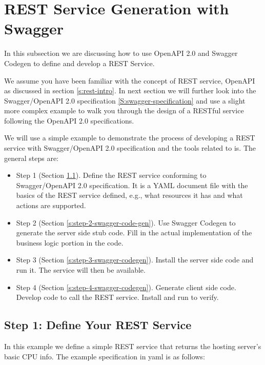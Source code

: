 
\section{REST Service Generation with Swagger}
\label{c:swagger-codegen}


In this subsection we are discussing how to use OpenAPI 2.0 and Swagger
Codegen to define and develop a REST Service.

We assume you have been familiar with the concept of REST service,
OpenAPI as discussed in section \ref{s:rest-intro}.
In next section we will further look into the
Swagger/OpenAPI 2.0 specification \ref{S:swagger-specification} and
use a slight more complex example to walk you through the design of
a RESTful service following the OpenAPI 2.0 specifications.

We will use a simple example to demonstrate the process of developing a
REST service with Swagger/OpenAPI 2.0 specification and the tools
related to is. The general steps are:

\begin{itemize}
\item Step 1 (Section \ref{s:step-1-define-your-rest-service}). Define
  the REST service conforming to Swagger/OpenAPI 2.0 specification. It
  is a YAML document file with the basics of the REST service defined,
  e.g., what resources it has and what actions are supported.
\item Step 2 (Section \ref{s:step-2-swagger-code-gen}). Use Swagger
  Codegen to generate the server side stub code.  Fill in the actual
  implementation of the business logic portion in the code.
\item Step 3 (Section \ref{s:step-3-swagger-codegen}). Install the
  server side code and run it. The service will then be available.
\item Step 4 (Section \ref{s:step-4-swagger-codegen}). Generate client
  side code. Develop code to call the REST service. Install and run to
  verify.
\end{itemize}

\subsection{Step 1: Define Your REST  Service}
\label{s:step-1-define-your-rest-service}

In this example we define a simple REST service that returns the hosting
server's basic CPU info. The example specification in yaml is as
follows:


